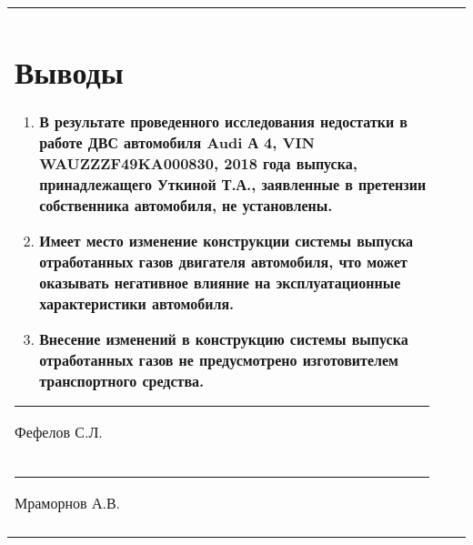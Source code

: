 {\begin{longtable}{G{25mm}|M{44mm}|G{70mm}}
%


\section{Выводы}

\begin{enumerate}
\item \textbf{ В результате проведенного исследования  недостатки в работе ДВС автомобиля Audi А 4, VIN WAUZZZF49KA000830, 2018 года выпуска, принадлежащего Уткиной Т.А., заявленные в претензии собственника автомобиля, не установлены.}

\item  \textbf{Имеет место изменение конструкции системы выпуска отработанных газов двигателя автомобиля,  что  может оказывать негативное влияние на эксплуатационные характеристики автомобиля.%
}

\item  \textbf{Внесение изменений в конструкцию системы выпуска отработанных газов не предусмотрено изготовителем транспортного средства.} 
%
%

	
\end{enumerate}
    
\vspace{6mm}

  \hfill    \rule{45mm}{0.1 mm}     {Фефелов С.Л.}\\[5mm]

  \hfill    \rule{45mm}{0.1 mm}   {Мраморнов А.В.}\\
\relax


\end{longtable}}
